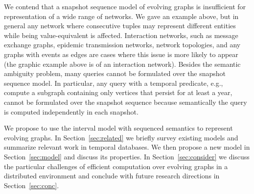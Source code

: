 
We contend that a snapshot sequence model of evolving graphs is
insufficient for representation of a wide range of networks.  We gave
an example above, but in general any network where consecutive tuples
may represent different entities while being value-equivalent is
affected.  Interaction networks, such as message exchange graphs,
epidemic transmission networks, network topologies, and any graphs
with events as edges are cases where this issue is more likely to
appear (the graphic example above is of an interaction network).
Besides the semantic ambiguity problem, many queries cannot be
formulated over the snapshot sequence model.  In particular, any query
with a temporal predicate, e.g., compute a subgraph containing only
vertices that persist for at least a year, cannot be formulated over
the snapshot sequence because semantically the query is computed
independently in each snapshot.

We propose to use the interval model with sequenced semantics to
represent evolving graphs.  In Section~\ref{sec:related} we briefly
survey existing models and summarize relevant work in temporal
databases.  We then propose a new model in Section~\ref{sec:model} and
discuss its properties.  In Section~\ref{sec:consider} we discuss the
particular challenges of efficient computation over evolving graphs in
a distributed environment and conclude with future research directions
in Section~\ref{sec:conc}.
